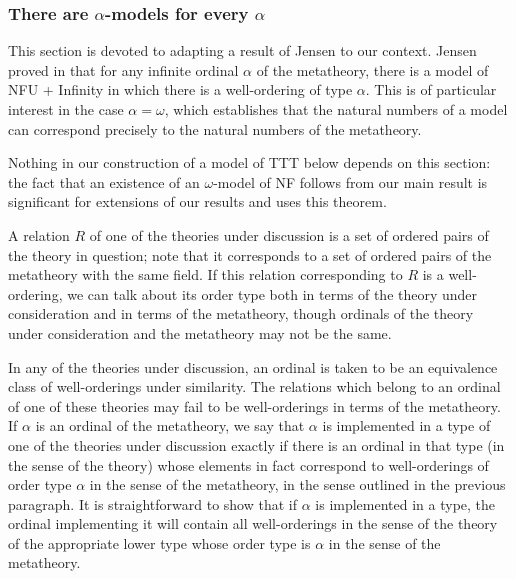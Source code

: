 \documentclass[112pt]{article}
\theoremstyle{definition}
\theoremstyle{remark}
\begin{document}
\newpage

\subsubsection{There are $\alpha$-models for every $\alpha$}

This section is devoted to adapting a result of Jensen to our context.  Jensen proved in \cite{nfu} that for any infinite ordinal $\alpha$ of the metatheory, there is a model of NFU + Infinity in which there is a well-ordering of type $\alpha$.  This is of particular interest in the case $\alpha=\omega$, which establishes that the natural numbers of a model can correspond precisely to the natural numbers of the metatheory.

Nothing in our construction of a model of TTT below depends on this section:  the fact that an existence of an $\omega$-model of NF follows from our main result is significant for extensions of our results and uses this theorem.

A relation $R$ of one of the theories under discussion is a set of ordered pairs of the theory in question;  note that it corresponds to a set of ordered pairs of the metatheory with the same field.  If this relation corresponding to  $R$ is a well-ordering, we can talk about its order type both in terms of the theory under consideration and in terms of the metatheory, though ordinals of the theory under consideration and the metatheory may not be the same.

In any of the theories under discussion, an ordinal is taken to be an equivalence class of well-orderings under similarity.
The relations which belong to an ordinal of one of these theories may fail to be well-orderings in terms of the metatheory.
If $\alpha$ is an ordinal of the metatheory, we say that $\alpha$ is implemented in a type of one of the theories under discussion
exactly if there is an ordinal in that type (in the sense of the theory) whose elements in fact correspond to well-orderings of order type $\alpha$ in the sense of the metatheory, in the sense outlined in the previous paragraph.  It is straightforward to show that if $\alpha$ is implemented in a type, the ordinal implementing it will contain all well-orderings in the sense of the theory of the appropriate lower type whose order type is $\alpha$ in the sense of the metatheory.
\end{document}
